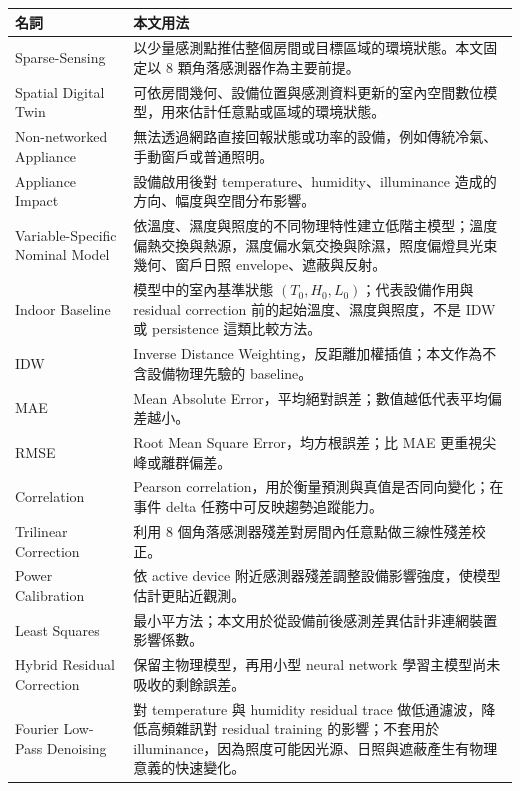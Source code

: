 \documentclass[12pt,a4paper]{article}
\begin{document}
\begin{table}[htbp]
\centering
\footnotesize
\renewcommand{\arraystretch}{1.25}
\begin{tabular}{|>{\raggedright\arraybackslash}p{}|>{\raggedright\arraybackslash}p{}|}
\hline
\textbf{名詞} & \textbf{本文用法} \\
\hline
Sparse-Sensing & 以少量感測點推估整個房間或目標區域的環境狀態。本文固定以 8 顆角落感測器作為主要前提。 \\
\hline
Spatial Digital Twin & 可依房間幾何、設備位置與感測資料更新的室內空間數位模型，用來估計任意點或區域的環境狀態。 \\
\hline
Non-networked Appliance & 無法透過網路直接回報狀態或功率的設備，例如傳統冷氣、手動窗戶或普通照明。 \\
\hline
Appliance Impact & 設備啟用後對 temperature、humidity、illuminance 造成的方向、幅度與空間分布影響。 \\
\hline
Variable-Specific Nominal Model & 依溫度、濕度與照度的不同物理特性建立低階主模型；溫度偏熱交換與熱源，濕度偏水氣交換與除濕，照度偏燈具光束幾何、窗戶日照 envelope、遮蔽與反射。 \\
\hline
Indoor Baseline & 模型中的室內基準狀態 $(T_0,H_0,L_0)$；代表設備作用與 residual correction 前的起始溫度、濕度與照度，不是 IDW 或 persistence 這類比較方法。 \\
\hline
IDW & Inverse Distance Weighting，反距離加權插值；本文作為不含設備物理先驗的 baseline。 \\
\hline
MAE & Mean Absolute Error，平均絕對誤差；數值越低代表平均偏差越小。 \\
\hline
RMSE & Root Mean Square Error，均方根誤差；比 MAE 更重視尖峰或離群偏差。 \\
\hline
Correlation & Pearson correlation，用於衡量預測與真值是否同向變化；在事件 delta 任務中可反映趨勢追蹤能力。 \\
\hline
Trilinear Correction & 利用 8 個角落感測器殘差對房間內任意點做三線性殘差校正。 \\
\hline
Power Calibration & 依 active device 附近感測器殘差調整設備影響強度，使模型估計更貼近觀測。 \\
\hline
Least Squares & 最小平方法；本文用於從設備前後感測差異估計非連網裝置影響係數。 \\
\hline
Hybrid Residual Correction & 保留主物理模型，再用小型 neural network 學習主模型尚未吸收的剩餘誤差。 \\
\hline
Fourier Low-Pass Denoising & 對 temperature 與 humidity residual trace 做低通濾波，降低高頻雜訊對 residual training 的影響；不套用於 illuminance，因為照度可能因光源、日照與遮蔽產生有物理意義的快速變化。 \\

\end{tabular}
\end{table}
\end{document}
